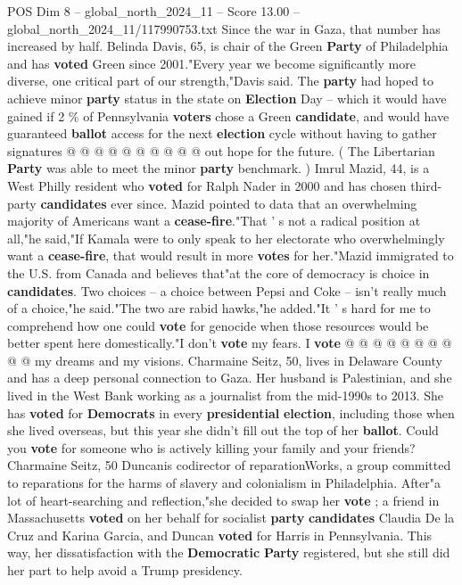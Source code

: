 \begin{textsample}{POS Dim 8 – global\_north\_2024\_11 – Score 13.00 – global\_north\_2024\_11/117990753.txt}
Since the war in Gaza, that number has increased by half.
Belinda Davis, 65, is chair of the Green \textbf{Party} of Philadelphia and has \textbf{voted} Green since 2001."Every year we become significantly more diverse, one critical part of our strength,"Davis said.
The \textbf{party} had hoped to achieve minor \textbf{party} status in the state on \textbf{Election} Day -- which it would have gained if 2 \% of Pennsylvania \textbf{voters} chose a Green \textbf{candidate}, and would have guaranteed \textbf{ballot} access for the next \textbf{election} cycle without having to gather signatures @ @ @ @ @ @ @ @ @ @ out hope for the future. ( The Libertarian \textbf{Party} was able to meet the minor \textbf{party} benchmark. ) Imrul Mazid, 44, is a West Philly resident who \textbf{voted} for Ralph Nader in 2000 and has chosen third-party \textbf{candidates} ever since.
Mazid pointed to data that an overwhelming majority of Americans want a \textbf{cease-fire}."That ' s not a radical position at all,"he said,"If Kamala were to only speak to her electorate who overwhelmingly want a \textbf{cease-fire}, that would result in more \textbf{votes} for her."Mazid immigrated to the U.S. from Canada and believes that"at the core of democracy is choice in \textbf{candidates}.
Two choices -- a choice between Pepsi and Coke -- isn't really much of a choice,"he said."The two are rabid hawks,"he added."It ' s hard for me to comprehend how one could \textbf{vote} for genocide when those resources would be better spent here domestically."I don't \textbf{vote} my fears.
I \textbf{vote} @ @ @ @ @ @ @ @ @ @ my dreams and my visions.
Charmaine Seitz, 50, lives in Delaware County and has a deep personal connection to Gaza.
Her husband is Palestinian, and she lived in the West Bank working as a journalist from the mid-1990s to 2013.
She has \textbf{voted} for \textbf{Democrats} in every \textbf{presidential} \textbf{election}, including those when she lived overseas, but this year she didn't fill out the top of her \textbf{ballot}.
Could you \textbf{vote} for someone who is actively killing your family and your friends?
Charmaine Seitz, 50 Duncanis codirector of reparationWorks, a group committed to reparations for the harms of slavery and colonialism in Philadelphia.
After"a lot of heart-searching and reflection,"she decided to swap her \textbf{vote} ; a friend in Massachusetts \textbf{voted} on her behalf for socialist \textbf{party} \textbf{candidates} Claudia De la Cruz and Karina Garcia, and Duncan \textbf{voted} for Harris in Pennsylvania.
This way, her dissatisfaction with the \textbf{Democratic} \textbf{Party} registered, but she still did her part to help avoid a Trump presidency.

\end{textsample}
